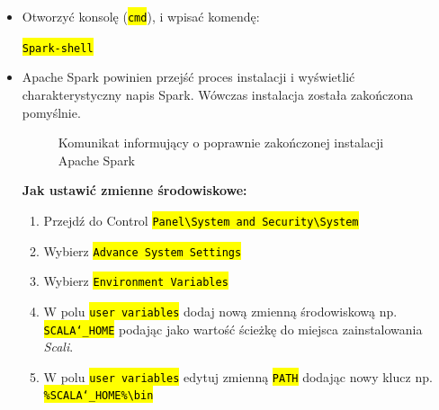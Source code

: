 \documentclass[a4paper,onecolumn,oneside,12pt]{memoir}
\begin{document}
{\begin{itemize}
\begin{itemize}
{\centerline{\texttt{\hl{HADOOP{\char`_}HOME = Lokalizacja{\char`_}utworzonego{\char`_}folderu{\char`_}Hadoop}}}
}
\pagebreak
\vspace*{1mm}
\item {
\textbf{Apache Spark z Hadoop 2.7} - \underline{\href{http://spark.apache.org/downloads.html}{Link do pobrania}}  \\
Wybierz najnowszą wersję oraz \textit{package type} jako \textit{Pre-built for Apache Hadoop 2.7 and later}. Gdy \textit{Spark} zostanie zainstalowany, należy ustawić zmienne środowiskowe: \texttt{\hl{SPARK{\char`_}HOME}} jako ścieżkę do miejsca, gdzie zainstalowano \textit{Spark’a} oraz dodać ścieżkę \texttt{\hl{\%SPARK{\char`_}HOME\%\textbackslash bin}} do \texttt{\hl{PATH}}.
}
\end{itemize}

\item Otworzyć konsolę (\texttt{\hl{cmd}}), i wpisać komendę: \\
\centerline{\texttt{\hl{Spark-shell}}}
\item[] Apache Spark powinien przejść proces instalacji i wyświetlić charakterystyczny napis Spark. Wówczas instalacja została zakończona pomyślnie.


\begin{figure}[h]
	\centering
	\caption{Komunikat informujący o poprawnie zakończonej instalacji Apache Spark}
	\label{fig:stronaTytulowa}
\end{figure}


\begin{framed}
\textbf{Jak ustawić zmienne środowiskowe:}
\begin{enumerate}[labelwidth=\widthof{\ref{last-item}},label=\arabic*.]
\item Przejdź do Control \texttt{\hl{Panel\textbackslash System and Security\textbackslash System }}
\item Wybierz \texttt{\hl{Advance System Settings}} 
\item Wybierz \texttt{\hl{Environment Variables}}
\item W polu \texttt{\hl{user variables}} dodaj  nową zmienną środowiskową np. \texttt{\hl{SCALA{\char`_}HOME}} podając jako wartość ścieżkę do miejsca zainstalowania \textit{Scali}.
\item W polu \texttt{\hl{user variables}} edytuj zmienną \texttt{\hl{PATH}} dodając nowy klucz np. \texttt{\hl{\%SCALA{\char`_}HOME\%\textbackslash bin}}


\end{enumerate}
\end{framed}
\end{itemize}}
\end{document}
